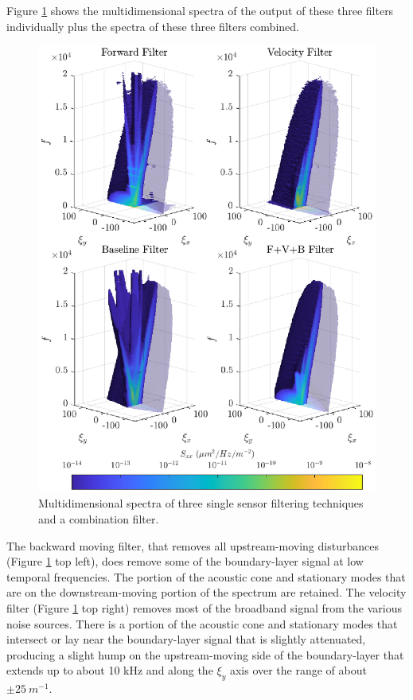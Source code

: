 Figure \ref{fig:08_dispersion_filters} shows the multidimensional spectra of the output of these three filters individually plus the spectra of these three filters combined.
\begin{figure}
  \centering
  \includegraphics{../matlab/08_conclusion/dispersion_filters.eps}
  \caption{Multidimensional spectra of three single sensor filtering techniques and a combination filter.}
  \label{fig:08_dispersion_filters}
\end{figure}
The backward moving filter, that removes all upstream-moving disturbances (Figure \ref{fig:08_dispersion_filters} top left), does remove some of the boundary-layer signal at low temporal frequencies.
The portion of the acoustic cone and stationary modes that are on the downstream-moving portion of the spectrum are retained.
The velocity filter (Figure \ref{fig:08_dispersion_filters} top right) removes most of the broadband signal from the various noise sources.
There is a portion of the acoustic cone and stationary modes that intersect or lay near the boundary-layer signal that is slightly attenuated, producing a slight hump on the upstream-moving side of the boundary-layer that extends up to about 10 kHz and along the $\xi_y$ axis over the range of about $\pm25\ m^{-1}$.

